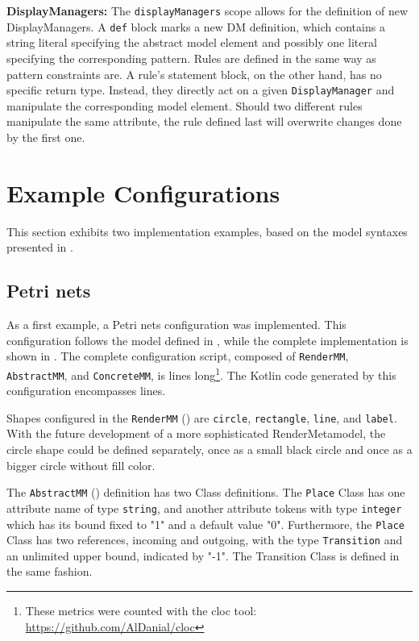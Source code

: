 \textbf{DisplayManagers:} The \texttt{displayManagers} scope allows for the definition of new DisplayManagers. A \texttt{def} block marks a new DM definition, which contains a string literal specifying the abstract model element and possibly one literal specifying the corresponding pattern. 
Rules are defined in the same way as pattern constraints are. A rule's statement block, on the other hand, has no specific return type. Instead, they directly act on a given \texttt{DisplayManager} and manipulate the corresponding model element. Should two different rules manipulate the same attribute, the rule defined last will overwrite changes done by the first one.

\section{Example Configurations}
\label{sec:example-configs}
This section exhibits two implementation examples, based on the model syntaxes presented in .

\subsection{Petri nets}
\label{sec:petri-impl}
As a first example, a Petri nets configuration was implemented. This configuration follows the model defined in , while the complete implementation is shown in . The complete configuration script, composed of \texttt{RenderMM}, \texttt{AbstractMM}, and \texttt{ConcreteMM}, is \petriConfigLoC lines long\footnote{These metrics were counted with the cloc tool: \url{https://github.com/AlDanial/cloc}}. The Kotlin code generated by this configuration encompasses \petriGeneratedLoC lines. 

Shapes configured in the \texttt{RenderMM} () are \texttt{circle}, \texttt{rectangle}, \texttt{line}, and \texttt{label}. With the future development of a more sophisticated RenderMetamodel, the circle shape could be defined separately, once as a small black circle and once as a bigger circle without fill color. 

The \texttt{AbstractMM} () definition has two Class definitions. The \texttt{Place} Class has one attribute name of type \texttt{string}, and another attribute tokens with type \texttt{integer} which has its bound fixed to "1" and a default value "0". Furthermore, the \texttt{Place} Class has two references, incoming and outgoing, with the type \texttt{Transition} and an unlimited upper bound, indicated by "-1". The Transition Class is defined in the same fashion.

